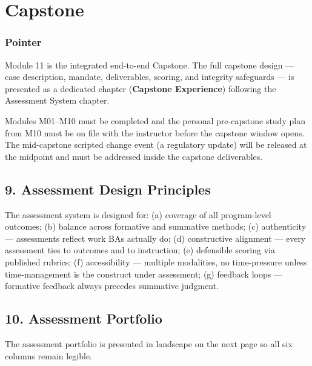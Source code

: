 \documentclass[11pt,letterpaper,oneside]{report}
\begin{document}
\chapter{Capstone}

\subsection*{Pointer}
Module 11 is the integrated end-to-end Capstone. The full capstone design --- case description, mandate, deliverables, scoring, and integrity safeguards --- is presented as a dedicated chapter (\textbf{Capstone Experience}) following the Assessment System chapter.

\begin{curriculumprerequisites}
Modules M01--M10 must be completed and the personal pre-capstone study plan from M10 must be on file with the instructor before the capstone window opens. The mid-capstone scripted change event (a regulatory update) will be released at the midpoint and must be addressed inside the capstone deliverables.
\end{curriculumprerequisites}


\section*{9. Assessment Design Principles}
The assessment system is designed for: (a) coverage of all program-level outcomes; (b) balance across formative and summative methods; (c) authenticity --- assessments reflect work BAs actually do; (d) constructive alignment --- every assessment ties to outcomes and to instruction; (e) defensible scoring via published rubrics; (f) accessibility --- multiple modalities, no time-pressure unless time-management is the construct under assessment; (g) feedback loops --- formative feedback always precedes summative judgment.

\section*{10. Assessment Portfolio}
The assessment portfolio is presented in landscape on the next page so all six columns remain legible.
\end{document}
